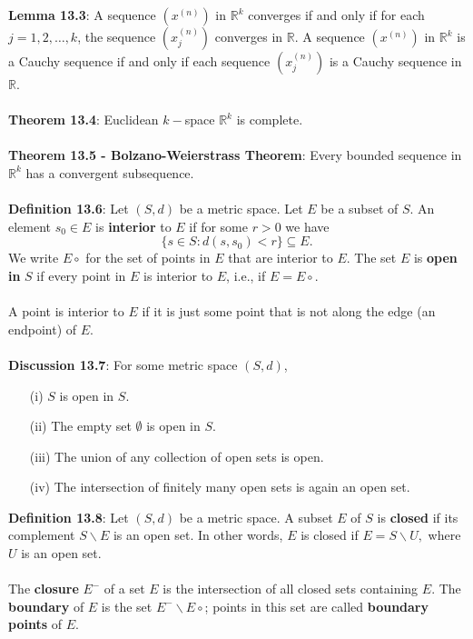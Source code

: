\documentclass{article}
\theoremstyle{definition}
\begin{document}
\textbf{Lemma 13.3}: A sequence $(x^{(n)})$ in $\mathbb{R}^k$ converges if and only if for each $j = 1, 2, \dots, k$, the sequence $(x^{(n)}_j)$ converges in $\mathbb{R}$. A sequence $(x^{(n)})$ in $\mathbb{R}^k$ is a Cauchy sequence if and only if each sequence $(x^{(n)}_j)$ is a Cauchy sequence in $\mathbb{R}$. \\ \\
\textbf{Theorem 13.4}: Euclidean $k-$space $\mathbb{R}^k$ is complete. \\ \\
\textbf{Theorem 13.5 - Bolzano-Weierstrass Theorem}: Every bounded sequence in $\mathbb{R}^k$ has a convergent subsequence. \\ \\
\textbf{Definition 13.6}: Let $(S, d)$ be a metric space. Let $E$ be a subset of $S$. An element $s_0 \in E$ is \textbf{interior} to $E$ if for some $r > 0$ we have $$\{s \in S: d(s, s_0) < r\} \subseteq E.$$ We write $E \circ$ for the set of points in $E$ that are interior to $E$. The set $E$ is \textbf{open in} $S$ if every point in $E$ is interior to $E$, i.e., if $E = E \circ$. \\ \\
A point is interior to $E$ if it is just some point that is not along the edge (an endpoint) of $E$. \\ \\
\textbf{Discussion 13.7}: For some metric space $(S, d)$, \begin{enumerate}
    \item[(i)] $S$ is open in $S$.
    \item[(ii)] The empty set $\emptyset$ is open in $S$.
    \item[(iii)] The union of any collection of open sets is open.
    \item[(iv)] The intersection of finitely many open sets is again an open set.
\end{enumerate} $ $ \\
\textbf{Definition 13.8}: Let $(S, d)$ be a metric space. A subset $E$ of $S$ is \textbf{closed} if its complement $S \backslash E$ is an open set. In other words, $E$ is closed if $E = S \backslash U,$ where $U$ is an open set. \\ \\
The \textbf{closure} $E^-$ of a set $E$ is the intersection of all closed sets containing $E$. The \textbf{boundary} of $E$ is the set $E^- \backslash E \circ$; points in this set are called \textbf{boundary points} of $E$. \\ \\
\end{document}
